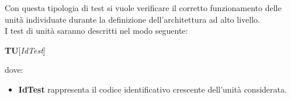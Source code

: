 Con questa tipologia di test si vuole verificare il corretto funzionamento delle unità individuate  durante la definizione dell'architettura ad alto livello.\\
I test di unità saranno descritti nel modo seguente:
\begin{center}
\textbf{TU}[\textit{IdTest}]
\end{center}
dove:
\begin{itemize}
\item \textbf{IdTest} rappresenta il codice identificativo crescente dell'unità considerata.
\end{itemize}
